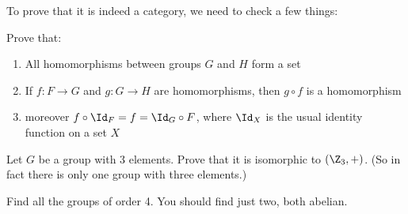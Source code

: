 To prove that it is indeed a category, we need to check a few things:

\begin{exercise}
  Prove that:
    \begin{enumerate}
      \item All homomorphisms between groups $G$ and $H$ form a set
      \item If $f: F\to G$ and $g: G\to H$ are homomorphisms, then $g\circ f$ is a homomorphism
      \item moreover $f\circ \Id_F=f=\Id_G\circ F$, where $\Id_X$ is the usual identity function on a set $X$
    \end{enumerate}
\end{exercise}


\begin{exercise}
  Let $G$ be a group with 3 elements. Prove that it is isomorphic to $(\Z_3, +)$. (So in fact there is only one group with three elements.)
\end{exercise}

\begin{exercise}
  Find all the groups of order 4. You should find just two, both abelian.
\end{exercise}


